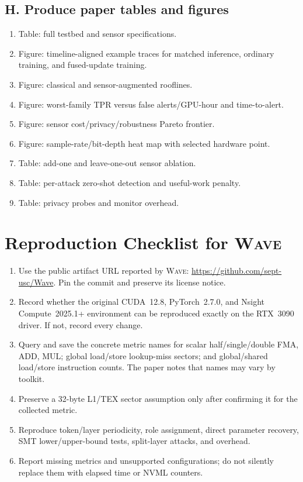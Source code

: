 \documentclass[sigplan,anonymous,review,nonacm]{acmart}
\newcommand{\wave}{\textsc{Wave}}
\begin{document}
\subsection{H. Produce paper tables and figures}

\begin{enumerate}
\item Table: full testbed and sensor specifications.
\item Figure: timeline-aligned example traces for matched inference, ordinary training, and fused-update training.
\item Figure: classical and sensor-augmented rooflines.
\item Figure: worst-family TPR versus false alerts/GPU-hour and time-to-alert.
\item Figure: sensor cost/privacy/robustness Pareto frontier.
\item Figure: sample-rate/bit-depth heat map with selected hardware point.
\item Table: add-one and leave-one-out sensor ablation.
\item Table: per-attack zero-shot detection and useful-work penalty.
\item Table: privacy probes and monitor overhead.
\end{enumerate}

\section{Reproduction Checklist for \wave{}}

\begin{enumerate}
\item Use the public artifact URL reported by \wave{}: \url{https://github.com/sept-usc/Wave}. Pin the commit and preserve its license notice.
\item Record whether the original CUDA~12.8, PyTorch~2.7.0, and Nsight Compute~2025.1+ environment can be reproduced exactly on the RTX~3090 driver. If not, record every change.
\item Query and save the concrete metric names for scalar half/single/double FMA, ADD, MUL; global load/store lookup-miss sectors; and global/shared load/store instruction counts. The paper notes that names may vary by toolkit.
\item Preserve a 32-byte L1/TEX sector assumption only after confirming it for the collected metric.
\item Reproduce token/layer periodicity, role assignment, direct parameter recovery, SMT lower/upper-bound tests, split-layer attacks, and overhead.
\item Report missing metrics and unsupported configurations; do not silently replace them with elapsed time or NVML counters.
\end{enumerate}
\end{document}

